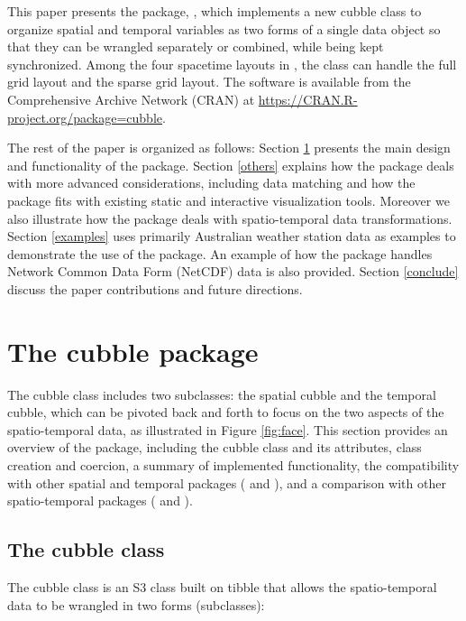 \documentclass[
  shortnames]{jss}
\begin{document}
This paper presents the  package, , which implements a new cubble class to organize spatial and temporal variables as two forms of a single data object so that they can be wrangled separately or combined, while being kept synchronized. Among the four spacetime layouts in \citet{spacetime}, the  class can handle the full grid layout and the sparse grid layout. The software is available from the Comprehensive  Archive Network (CRAN) at \url{https://CRAN.R-project.org/package=cubble}.

The rest of the paper is organized as follows: Section \ref{cubble} presents the main design and functionality of the  package. Section \ref{others} explains how the  package deals with more advanced considerations, including data matching and how the package fits with existing static and interactive visualization tools. Moreover we also illustrate how the  package deals with spatio-temporal data transformations. Section \ref{examples} uses primarily Australian weather station data as examples to demonstrate the use of the package. An example of how the  package handles Network Common Data Form (NetCDF) data is also provided. Section \ref{conclude} discuss the paper contributions and future directions.

\hypertarget{cubble}{%
\section{The cubble package}\label{cubble}}

The cubble class includes two subclasses: the spatial cubble and the temporal cubble, which can be pivoted back and forth to focus on the two aspects of the spatio-temporal data, as illustrated in Figure \ref{fig:face}. This section provides an overview of the  package, including the cubble class and its attributes, class creation and coercion, a summary of implemented functionality, the compatibility with other spatial and temporal packages ( and ), and a comparison with other spatio-temporal packages ( and ).

\hypertarget{object}{%
\subsection{The cubble class}\label{object}}

The cubble class is an S3 class built on tibble that allows the spatio-temporal data to be wrangled in two forms (subclasses):
\end{document}
